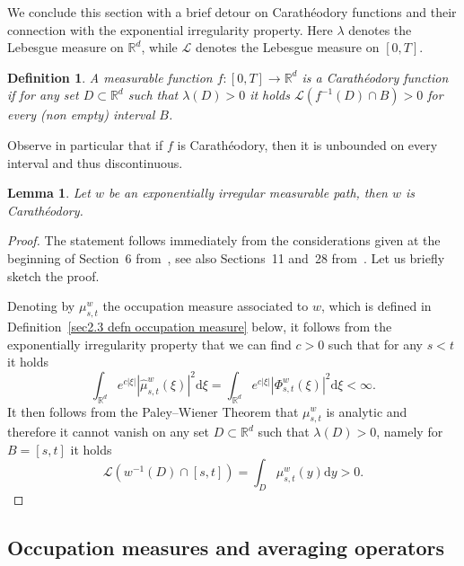 \documentclass[10pt]{article}
\newcommand{\mathd}{\mathrm{d}}
\newtheorem{definition}[theorem]{Definition}
\newtheorem{lemma}[theorem]{Lemma}
\begin{document}
We conclude this section with a brief detour on Carath{\'e}odory functions and
their connection with the exponential irregularity property. Here $\lambda$
denotes the Lebesgue measure on $\mathbb{R}^d$, while $\mathcal{L}$ denotes
the Lebesgue measure on $[0, T]$.

\begin{definition}
  \label{sec2.2 defn charatheodory}A measurable function $f : [0, T]
  \rightarrow \mathbb{R}^d$ is a Carath{\'e}odory function if for any set $D
  \subset \mathbb{R}^d$ such that $\lambda (D) > 0$ it holds $\mathcal{L}
  (f^{- 1} (D) \cap B) > 0$ for every (non empty) interval $B$.
\end{definition}

Observe in particular that if $f$ is Carath{\'e}odory, then it is unbounded on
every interval and thus discontinuous.

\begin{lemma}
  \label{sec2.2 exp implies charatheodory}Let $w$ be an exponentially
  irregular measurable path, then $w$ is Carath{\'e}odory.
\end{lemma}

\begin{proof}
  The statement follows immediately from the considerations given at the
  beginning of Section~6 from~{\cite{berman69}}, see also Sections~11 and~28
  from~{\cite{geman}}. Let us briefly sketch the proof.
  
  Denoting by $\mu_{s, t}^w$ the occupation measure associated to $w$, which
  is defined in Definition~\ref{sec2.3 defn occupation measure} below, it
  follows from the exponentially irregularity property that we can find $c >
  0$ such that for any $s < t$ it holds
  \[ \int_{\mathbb{R}^d} e^{c | \xi |} | \hat{\mu}_{s, t}^w (\xi) |^2 \mathd
     \xi = \int_{\mathbb{R}^d} e^{c | \xi |} | \Phi^w_{s, t} (\xi) |^2 \mathd
     \xi < \infty . \]
  It then follows from the Paley--Wiener Theorem that $\mu^w_{s, t}$ is
  analytic and therefore it cannot vanish on any set $D \subset \mathbb{R}^d$
  such that $\lambda (D) > 0$, namely for $B = [s, t]$ it holds
  \[ \mathcal{L} (w^{- 1} (D) \cap [s, t]) = \int_D \mu_{s, t}^w (y) \mathd y
     > 0. \]
\end{proof}

\subsection{Occupation measures and averaging operators}\label{sec2.3}
\end{document}
